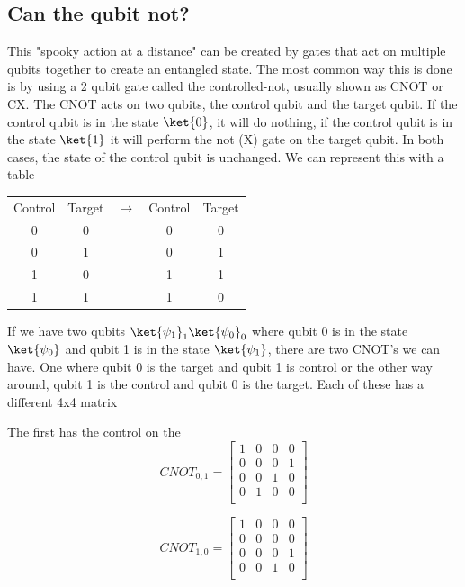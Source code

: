 \documentclass{book}
\begin{document}
\subsection{ Can the qubit not? }

This "spooky action at a distance" can be created by gates that act on multiple qubits together to create an entangled state. The most common way this is done is by using a 2 qubit gate called the controlled-not, usually shown as CNOT or CX. The CNOT acts on two qubits, the control qubit and the target qubit. If the control qubit is in the state $\ket{0}$, it will do nothing, if the control qubit is in the state $\ket{1}$ it will perform the not (X) gate on the target qubit. In both cases, the state of the control qubit is unchanged. We can represent this with a table

\begin{center}
\begin{tabular}{ | c | c | c | c | c |}

 Control & Target & $\rightarrow{}$ & Control & Target \\ 
  
 0 & 0 &  & 0 & 0 \\ 
 
 0 & 1 &  & 0 & 1 \\
 
 1 & 0 &  & 1 & 1 \\
 
 1 & 1 &  & 1 & 0 \\
 
  
\end{tabular}
\end{center}

If we have two qubits $\ket{\psi_1}_1\ket{\psi_0}_0$ where qubit 0 is in the state $\ket{\psi_0}$ and qubit 1 is in the state $\ket{\psi_1}$, there are two CNOT's we can have. One where qubit 0 is the target and qubit 1 is control or the other way around, qubit 1 is the control and qubit 0 is the target. Each of these has a different 4x4 matrix

The first has the control on the 
$$
CNOT_{0, 1} = \begin{bmatrix} 1 & 0 & 0 & 0 \\
0 & 0 & 0 & 1 \\
0 & 0 & 1 & 0 \\
0 & 1 & 0 & 0 \\
\end{bmatrix}
$$

$$
CNOT_{1, 0} = \begin{bmatrix} 1 & 0 & 0 & 0 \\
0 & 0 & 0 & 0 \\
0 & 0 & 0 & 1 \\
0 & 0 & 1 & 0 \\
\end{bmatrix}
$$
\end{document}
